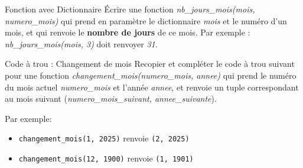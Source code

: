 \documentclass[a4paper, noanswers, addpoints, 12pt]{exam}
\begin{document}
\begin{questions}

\vspace{0.25cm}

\question[2] Fonction avec Dictionnaire
Écrire une fonction \textit{nb\_jours\_mois(mois, numero\_mois)} qui prend en paramètre le dictionnaire \textit{mois} et le numéro d'un mois, et qui renvoie le \textbf{nombre de jours} de ce mois.
Par exemple : \textit{nb\_jours\_mois(mois, 3)} doit renvoyer \textit{31}.
\vspace{0.25cm}

\question[4] Code à trou : Changement de mois
Recopier et compléter le code à trou suivant pour une fonction \textit{changement\_mois(numero\_mois, annee)} qui prend le numéro du mois actuel \textit{numero\_mois} et l'année \textit{annee}, et renvoie un tuple correspondant au mois suivant (\textit{numero\_mois\_suivant, annee\_suivante}).

Par exemple:
\begin{itemize}
    \item \texttt{changement\_mois(1, 2025)} renvoie \texttt{(2, 2025)}
    \item \texttt{changement\_mois(12, 1900)} renvoie \texttt{(1, 1901)}
\end{itemize}


\end{questions}
\end{document}
